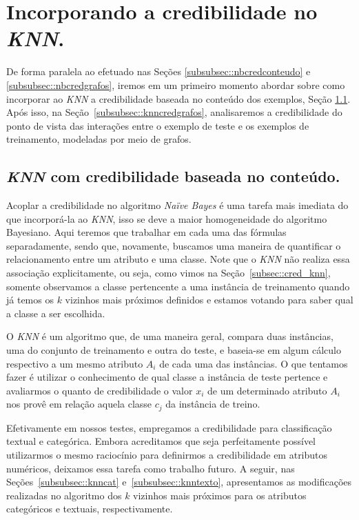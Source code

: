 \section{Incorporando a credibilidade no \textit{KNN}.}
\label{subsubsec::knn_cred}

De forma paralela ao efetuado nas Seções \ref{subsubsec::nbcredconteudo} e \ref{subsubsec::nbcredgrafos}, iremos em um primeiro momento abordar sobre como incorporar ao \textit{KNN} a credibilidade baseada no conteúdo dos exemplos, Seção \ref{subsubsec::knncredconteudo}. Após isso, na Seção~\ref{subsubsec::knncredgrafos}, analisaremos a credibilidade do ponto de vista das interações entre o exemplo de teste e os exemplos de treinamento, modeladas por meio de grafos.

\subsection{\textit{KNN} com credibilidade baseada no conteúdo.}
\label{subsubsec::knncredconteudo}


Acoplar a credibilidade no algoritmo \textit{Naïve Bayes} é uma tarefa mais imediata do que incorporá-la ao \textit{KNN}, isso se deve a maior homogeneidade do algoritmo Bayesiano. Aqui teremos que trabalhar em cada uma das fórmulas separadamente, sendo que, novamente, buscamos uma maneira de quantificar o relacionamento entre um atributo e uma classe. Note que o \textit{KNN} não realiza essa associação explicitamente, ou seja, como vimos na Seção~\ref{subsec::cred_knn}, somente observamos a classe pertencente a uma instância de treinamento quando já temos os $k$ vizinhos mais próximos definidos e estamos votando para saber qual a classe a ser escolhida.

O \textit{KNN} é um algoritmo que, de uma maneira geral, compara duas instâncias, uma do conjunto de treinamento e outra do teste, e baseia-se em algum cálculo respectivo a um mesmo atributo $A_i$ de cada uma das instâncias. O que tentamos fazer é utilizar o conhecimento de qual classe a instância de teste pertence e avaliarmos o quanto de credibilidade o valor $x_i$ de um determinado atributo $A_i$ nos provê em relação aquela classe $c_j$ da instância de treino.

Efetivamente em nossos testes, empregamos a credibilidade para classificação textual e categórica. Embora acreditamos que seja perfeitamente possível utilizarmos o mesmo raciocínio para definirmos a credibilidade em atributos numéricos, deixamos essa tarefa como trabalho futuro. A seguir, nas Seções~\ref{subsubsec::knncat} e~\ref{subsubsec::knntexto}, apresentamos as modificações realizadas no algoritmo dos $k$ vizinhos mais próximos para os atributos categóricos e textuais, respectivamente.

